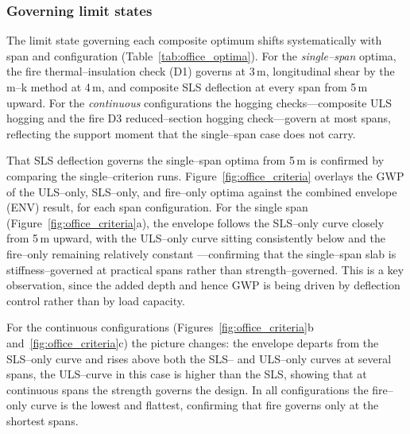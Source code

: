 \subsubsection{Governing limit states}
\label{sec:res_office_gov}
The limit state governing each composite optimum shifts systematically with span and configuration (Table~\ref{tab:office_optima}). For the \emph{single--span} optima, the fire thermal--insulation check (D1) governs at 3\,m, longitudinal shear by the m--k method at 4\,m, and composite SLS deflection at every span from 5\,m upward. For the \emph{continuous} configurations the hogging checks---composite ULS hogging and the fire D3 reduced--section hogging check---govern at most spans, reflecting the support moment that the single--span case does not carry.
 
That SLS deflection governs the single--span optima from 5\,m is confirmed by comparing the single--criterion runs. Figure~\ref{fig:office_criteria} overlays the GWP of the ULS--only, SLS--only, and fire--only optima against the combined envelope (ENV) result, for each span configuration. For the single span (Figure~\ref{fig:office_criteria}a), the envelope follows the SLS--only curve closely from 5\,m upward, with the ULS--only curve sitting consistently below and the fire--only remaining relatively constant ---confirming that the single--span slab is stiffness--governed at practical spans rather than strength--governed. This is a key observation, since the added depth and hence GWP is being driven by deflection control rather than by load capacity.
 
For the continuous configurations (Figures~\ref{fig:office_criteria}b and~\ref{fig:office_criteria}c) the picture changes: the envelope departs from the SLS--only curve and rises above both the SLS-- and ULS--only curves at several spans, the ULS--curve in this case is higher than the SLS, showing that at continuous spans the strength governs the design. In all configurations the fire--only curve is the lowest and flattest, confirming that fire governs only at the shortest spans.

